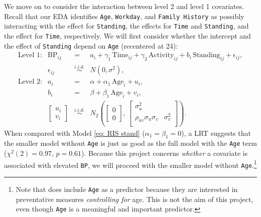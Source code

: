 \documentclass[12pt,twoside,letterpaper]{article}
\theoremstyle{definition}
\theoremstyle{definition}
\begin{document}
We move on to consider the interaction between level 2 and level 1 covariates. Recall that our EDA identifies \texttt{Age}, \texttt{Workday}, and \texttt{Family History} as possibly interacting with the effect for \texttt{Standing}, the effects for \texttt{Time} and \texttt{Standing}, and the effect for \texttt{Time}, respectively. We will first consider whether the intercept and the effect of \texttt{Standing} depend on \texttt{Age} (recentered at 24):
\begin{equation}\label{eq: RIS stand age}
    \begin{array}{rrcll}
        \text{Level 1}: & \text{BP}_{ij} &=& a_i + \gamma_1\, \text{Time}_{ij} + \gamma_2\, \text{Activity}_{ij} + b_i\, \text{Standing}_{ij} + \epsilon_{ij}, \\[0.5ex]
         & \epsilon_{ij} &\overset{i.i.d.}{\sim}& N(0, \sigma^2), \\[0.5ex]
        \text{Level 2}: & a_i &=& \alpha + \alpha_1\, \text{Age}_i + u_i, \\[0.5ex]
         & b_i &=& \beta + \beta_1\, \text{Age}_i + v_i, \\[1ex]
         & \begin{bmatrix} u_i \\ v_i 
         \end{bmatrix} &\overset{i.i.d.}{\sim}& N_2\left(\begin{bmatrix} 0 \\ 0 \end{bmatrix},\, \begin{bmatrix} \sigma_u^2 &\\ 
         \rho_{uv}\sigma_u\sigma_v & \sigma_v^2\\
         \end{bmatrix} \right).
    \end{array}
\end{equation}
When compared with Model \ref{eq: RIS stand} ($\alpha_1 = \beta_1 = 0$), a LRT suggests that the smaller model without \texttt{Age} is just as good as the full model with the \texttt{Age} term ($\chi^2 (2) = 0.97$, $p = 0.61$). Because this project concerns \emph{whether} a covariate is associated with elevated \texttt{BP}, we will proceed with the smaller model without \texttt{Age}.\footnote{Note that \citet{goldstein_ambulatory_2000} does include \texttt{Age} as a predictor because they are interested in preventative measures \emph{controlling for} age. This is not the aim of this project, even though \texttt{Age} is a meaningful and important predictor.} 
\end{document}
